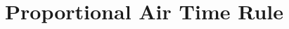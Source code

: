 \documentclass[12pt]{article}
\begin{document}







\FloatBarrier










\section{Proportional Air Time Rule}

\label{sec:counter}
\end{document}
